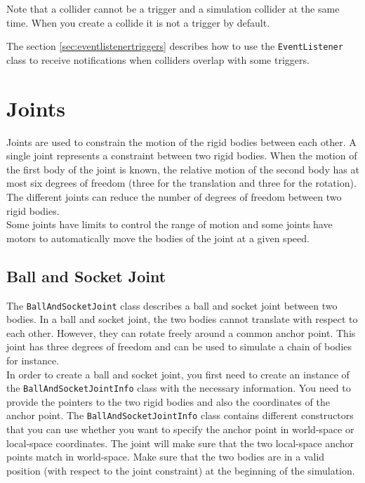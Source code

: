 \documentclass[a4paper,12pt]{article}
\begin{document}
    \vspace{0.6cm}

   Note that a collider cannot be a trigger and a simulation collider at the same time. When you create a collide it is not a trigger by default.
  
   \vspace{0.6cm}

   The section \ref{sec:eventlistenertriggers} describes how to use the \texttt{EventListener} class to receive notifications when colliders overlap
   with some triggers.
    
    \section{Joints}

    Joints are used to constrain the motion of the rigid bodies between each other. A single joint represents a constraint between two rigid bodies.
    When the motion of the first body of the joint is known, the relative motion of the second body has at most six degrees of freedom (three for the
    translation and three for the rotation). The different joints can reduce the number of degrees of freedom between two rigid bodies. \\

    Some joints have limits to control the range of motion and some joints have motors to automatically move the bodies of the joint at a given speed. \\

    \subsection{Ball and Socket Joint}

    The \texttt{BallAndSocketJoint} class describes a ball and socket joint between two bodies. In a ball and socket joint, the two bodies cannot
    translate with respect to each other. However, they can rotate freely around a common anchor point. This joint has three degrees of freedom
    and can be used to simulate a chain of bodies for instance. \\

    In order to create a ball and socket joint, you first need to create an instance of the \texttt{BallAndSocketJointInfo} class with the necessary
    information. You need to provide the pointers to the two rigid bodies and also the coordinates of the anchor point. The \texttt{BallAndSocketJointInfo}
    class contains different constructors that you can use whether you want to specify the anchor point in world-space or local-space coordinates.
    The joint will make sure that the two local-space anchor points match in world-space. Make sure that the two bodies are in a valid position (with
    respect to the joint constraint) at the beginning of the simulation. \\
\end{document}
